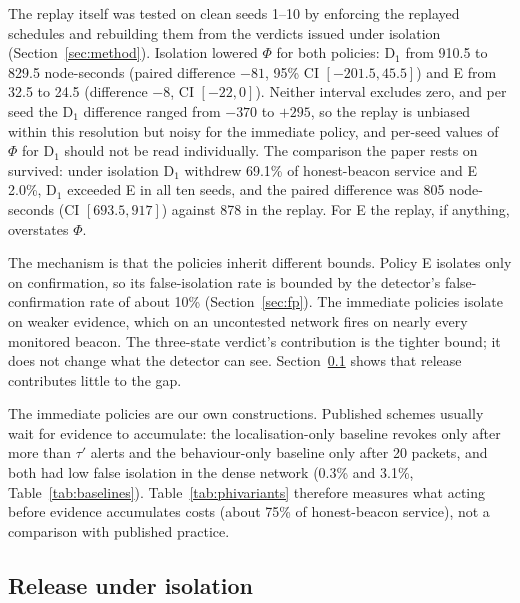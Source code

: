 The replay itself was tested on clean seeds 1--10 by enforcing the replayed
schedules and rebuilding them from the verdicts issued under isolation
(Section~\ref{sec:method}). Isolation lowered $\Phi$ for both policies: D$_1$
from 910.5 to 829.5 node-seconds (paired difference $-81$, 95\% CI
$[-201.5, 45.5]$) and E from 32.5 to 24.5 (difference $-8$, CI $[-22, 0]$).
Neither interval excludes zero, and per seed the D$_1$ difference ranged from
$-370$ to $+295$, so the replay is unbiased within this resolution but noisy
for the immediate policy, and per-seed values of $\Phi$ for D$_1$ should not
be read individually. The comparison the paper rests on survived: under
isolation D$_1$ withdrew 69.1\% of honest-beacon service and E 2.0\%, D$_1$
exceeded E in all ten seeds, and the paired difference was 805 node-seconds
(CI $[693.5, 917]$) against 878 in the replay. For E the replay, if anything,
overstates $\Phi$.

The mechanism is that the policies inherit different bounds. Policy E isolates
only on confirmation, so its false-isolation rate is bounded by the detector's
false-confirmation rate of about 10\% (Section~\ref{sec:fp}). The immediate
policies isolate on weaker evidence, which on an uncontested network fires on
nearly every monitored beacon. The three-state verdict's contribution is the
tighter bound; it does not change what the detector can see.
Section~\ref{sec:release} shows that release contributes little to the gap.

The immediate policies are our own constructions. Published schemes usually
wait for evidence to accumulate: the localisation-only baseline revokes only
after more than $\tau'$ alerts and the behaviour-only baseline only after 20
packets, and both had low false isolation in the dense network (0.3\% and
3.1\%, Table~\ref{tab:baselines}). Table~\ref{tab:phivariants} therefore
measures what acting before evidence accumulates costs (about 75\% of
honest-beacon service), not a comparison with published practice.

\subsection{Release under isolation}
\label{sec:release}

